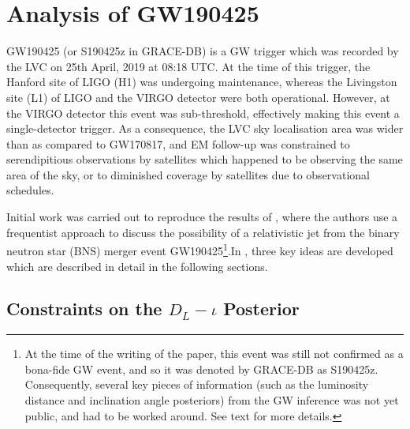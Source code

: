 \section{Analysis of GW190425}\label{sec:190425}

    GW190425 (or S190425z in GRACE-DB) is a GW trigger which was recorded by the LVC on
    25th April, 2019 at 08:18 UTC. At the time of this trigger, the Hanford site of LIGO
    (H1) was undergoing maintenance, whereas the Livingston site (L1) of LIGO and the
    VIRGO detector were both operational. However, at the VIRGO detector this event was
    sub-threshold, effectively making this event a single-detector trigger. As a
    consequence, the LVC sky localisation area was wider than as compared to GW170817,
    and EM follow-up was constrained to serendipitious observations by satellites which
    happened to be observing the same area of the sky, or to diminished coverage by
    satellites due to observational schedules.

    Initial work was carried out to reproduce the results of \cite{saleem_2020B}, where
    the authors use a frequentist approach to discuss the possibility of a relativistic
    jet from the binary neutron star (BNS) merger event GW190425\footnote
    {
        At the time of the writing of the paper, this event was still not confirmed as a
        bona-fide GW event, and so it was denoted by GRACE-DB as S190425z. Consequently,
        several key pieces of information (such as the luminosity distance and
        inclination angle posteriors) from the GW inference was not yet public, and had
        to be worked around. See text for more details.
    }.In \cite{saleem_2020B}, three key ideas  are developed which are described in
    detail in the following sections.

    \subsection{Constraints on the \texorpdfstring{$D_L-\iota$}{dL-iota} Posterior}
    \label{sec:dl-iota_posterior}


